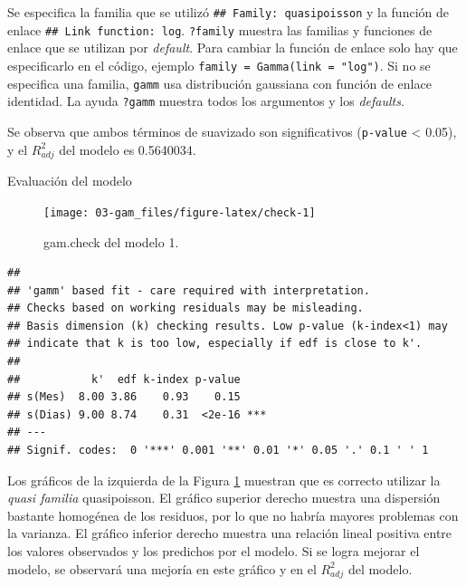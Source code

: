 \documentclass[
]{book}
\newenvironment{Shaded}{\begin{snugshade}}{\end{snugshade}}
\newcommand{\AttributeTok}[1]{\textcolor[rgb]{0.77,0.63,0.00}{#1}}
\newcommand{\DecValTok}[1]{\textcolor[rgb]{0.00,0.00,0.81}{#1}}
\newcommand{\FunctionTok}[1]{\textcolor[rgb]{0.00,0.00,0.00}{#1}}
\newcommand{\NormalTok}[1]{#1}
\newcommand{\SpecialCharTok}[1]{\textcolor[rgb]{0.00,0.00,0.00}{#1}}
\newcommand{\StringTok}[1]{\textcolor[rgb]{0.31,0.60,0.02}{#1}}
\begin{document}
Se especifica la familia que se utilizó \texttt{\#\#\ Family:\ quasipoisson} y la función de enlace \texttt{\#\#\ Link\ function:\ log}. \texttt{?family} muestra las familias y funciones de enlace que se utilizan por \emph{default}. Para cambiar la función de enlace solo hay que especificarlo en el código, ejemplo \texttt{family\ =\ Gamma(link\ =\ "log")}. Si no se especifica una familia, \texttt{gamm} usa distribución gaussiana con función de enlace identidad. La ayuda \texttt{?gamm} muestra todos los argumentos y los \emph{defaults}.

Se observa que ambos términos de suavizado son significativos (\texttt{p-value} \textless{} 0.05), y el \(R_{adj}^{2}\) del modelo es 0.5640034.

Evaluación del modelo

\begin{Shaded}
\end{Shaded}

\begin{figure}

{\centering \texttt{[image: 03-gam\_files/figure-latex/check-1]} 

}

\caption{gam.check del modelo 1.}\label{fig:check}
\end{figure}

\begin{verbatim}
## 
## 'gamm' based fit - care required with interpretation.
## Checks based on working residuals may be misleading.
## Basis dimension (k) checking results. Low p-value (k-index<1) may
## indicate that k is too low, especially if edf is close to k'.
## 
##           k'  edf k-index p-value    
## s(Mes)  8.00 3.86    0.93    0.15    
## s(Dias) 9.00 8.74    0.31  <2e-16 ***
## ---
## Signif. codes:  0 '***' 0.001 '**' 0.01 '*' 0.05 '.' 0.1 ' ' 1
\end{verbatim}

Los gráficos de la izquierda de la Figura \ref{fig:check} muestran que es correcto utilizar la \emph{quasi familia} quasipoisson. El gráfico superior derecho muestra una dispersión bastante homogénea de los residuos, por lo que no habría mayores problemas con la varianza. El gráfico inferior derecho muestra una relación lineal positiva entre los valores observados y los predichos por el modelo. Si se logra mejorar el modelo, se observará una mejoría en este gráfico y en el \(R_{adj}^{2}\) del modelo.
\end{document}
